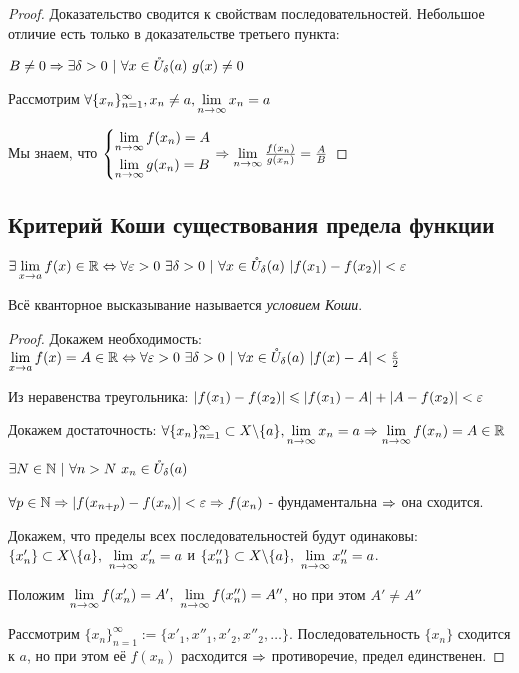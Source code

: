 \begin{proof}
	Доказательство сводится к свойствам последовательностей. Небольшое отличие есть только в доказательстве третьего пункта:
	
	$B \neq 0 \Ra \exists \delta > 0\ |\ \forall x \in \mc{U}_{\delta}(a)\ g(x) \neq 0$
	
	Рассмотрим $\forall \{x_n\}_{n = 1}^\infty, x_n \neq a, \lim\limits_{n \rightarrow \infty} x_n = a$
	
	Мы знаем, что $\left\{\begin{aligned}&{\lim\limits_{n \rightarrow \infty} f(x_n) = A} \\ &{\lim\limits_{n \rightarrow \infty} g(x_n) = B}\end{aligned}\right. \Rightarrow \lim\limits_{n \rightarrow \infty} \frac{f(x_n)}{g(x_n)} = \frac{A}{B}$
\end{proof}

\subsection{Критерий Коши существования предела функции}

\begin{theorem}
	$\exists \lim\limits_{x \rightarrow a} f(x) \in \mathbb{R} \Leftrightarrow \forall \varepsilon > 0\ \exists \delta > 0\ |\ \forall x \in \mathring{U}_{\delta}(a)\ |f(x_1) - f(x_2)| < \varepsilon$
	
	Всё кванторное высказывание называется \textit{условием Коши}.
\end{theorem}

\begin{proof}
	Докажем необходимость: $\liml_{x \ra a} f(x) = A \in \R \lra \forall \eps > 0\ \exists \delta > 0\ |\ \forall x \in \mc{U}_{\delta}(a)\ |f(x) - A| < \frac{\eps}{2}$
	
	Из неравенства треугольника: $|f(x_1) - f(x_2)| \leqslant |f(x_1) - A| + |A - f(x_2)| < \varepsilon$
	
	Докажем достаточность: $\forall \{x_n\}_{n = 1}^\infty \subset X \backslash \{a\}, \lim\limits_{n \rightarrow \infty} x_n = a \Rightarrow \lim\limits_{n \rightarrow \infty} f(x_n) = A \in \mathbb{R}$
	
	$\exists N \in \mathbb{N}\ |\ \forall n > N\ x_n \in \mathring{U}_{\delta}(a)$
	
	$\forall p \in \mathbb{N} \Rightarrow |f(x_{n + p}) - f(x_n)| < \varepsilon \Rightarrow f(x_n)$ - фундаментальна $\Rightarrow$ она сходится.
	
	Докажем, что пределы всех последовательностей будут одинаковы: $\{x'_n\} \subset X \backslash \{a\},\ \lim\limits_{n \rightarrow \infty} x'_n = a$ и $\{x''_n\} \subset X \backslash \{a\},\ \lim\limits_{n \rightarrow \infty} x''_n = a$.
	
	Положим $\lim\limits_{n \rightarrow \infty} f(x'_n) = A',\ \lim\limits_{n \rightarrow \infty} f(x''_n) = A''$, но при этом $A' \neq A''$
	
	Рассмотрим $\{x_n\}_{n = 1}^\infty := \{x'_1, x''_1, x'_2, x''_2, \dots\}$. Последовательность $\{x_n\}$ сходится к $a$, но при этом её $f(x_n)$ расходится $\Rightarrow$ противоречие, предел единственен.
\end{proof}